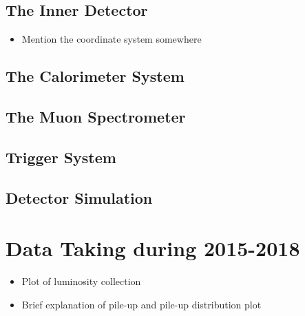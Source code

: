 \subsection{The Inner Detector}

\begin{itemize}
    \item Mention the coordinate system somewhere
\end{itemize}

\subsection{The Calorimeter System}
\subsection{The Muon Spectrometer}
\subsection{Trigger System}
\subsection{Detector Simulation}


\section{Data Taking during 2015-2018}
\begin{itemize}
    \item Plot of luminosity collection
    \item Brief explanation of pile-up and pile-up distribution plot
\end{itemize}

